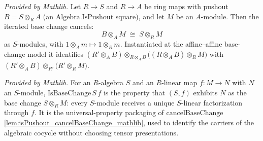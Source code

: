 \begin{lemma}
  \label{lem:isPushout_cancelBaseChange_mathlib}
  \mathlibok
  \textit{Provided by Mathlib.}
  Let \(R \to S\) and \(R \to A\) be ring maps with pushout \(B = S \otimes_R A\) (an
  \(\mathrm{Algebra.IsPushout}\) square), and let \(M\) be an \(A\)-module. Then the iterated base
  change cancels:
  \[
    B \otimes_A M \;\cong\; S \otimes_R M
  \]
  as \(S\)-modules, with \(1 \otimes_A m \mapsto 1 \otimes_R m\). Instantiated at the affine--affine
  base-change model it identifies \((R'\otimes_A B)\otimes_{R\otimes_A B}\bigl((R\otimes_A B)\otimes_R
  M\bigr)\) with \((R'\otimes_A B)\otimes_{R'}\bigl(R'\otimes_R M\bigr)\).
\end{lemma}

\begin{lemma}
  \label{lem:isBaseChange_mathlib}
  \mathlibok
  \textit{Provided by Mathlib.}
  For an \(R\)-algebra \(S\) and an \(R\)-linear map \(f : M \to N\) with \(N\) an \(S\)-module,
  \(\mathrm{IsBaseChange}\,S\,f\) is the property that \((S, f)\) exhibits \(N\) as the base change
  \(S \otimes_R M\): every \(S\)-module receives a unique \(S\)-linear factorization through \(f\).
  It is the universal-property packaging of \(\mathrm{cancelBaseChange}\)
  \cref{lem:isPushout_cancelBaseChange_mathlib}, used to identify the carriers of the algebraic
  cocycle without choosing tensor presentations.
\end{lemma}

